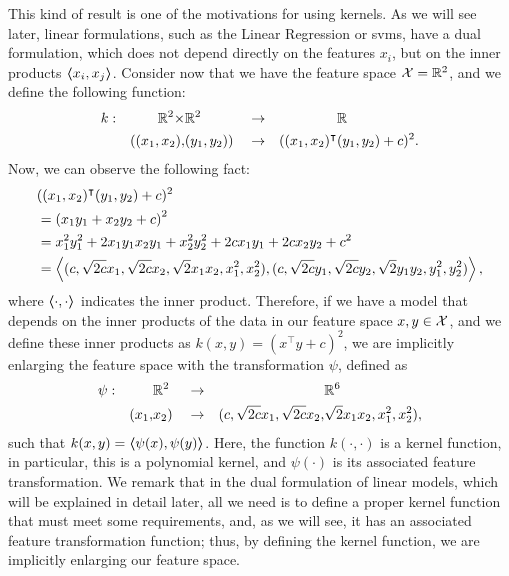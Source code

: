 This kind of result is one of the motivations for using kernels. 
As we will see later, linear formulations, such as the Linear Regression or \acrshort{svms}, have a dual formulation, which does not depend directly on the features $x_i$, but on the inner products $\bm{\left\langle} x_i, x_j \bm{\right\rangle}$.
Consider now that we have the feature space $\mathcal{X} = \mathbb{R}^2$, and we define the following function:
\begin{equation}
    \begin{aligned}
        \nonumber
        k: & &\mathbb{R}^2 \times &\mathbb{R}^2 & &\to& &\mathbb{R} \\
        & &((x_1, x_2), & (y_1, y_2))   & &\to& ((x_1, x_2)^\intercal &(y_1, y_2) + c)^2 .
    \end{aligned}
\end{equation}
Now, we can observe the following fact:
\begin{equation}
    \nonumber
    \begin{aligned}
        &((x_1, x_2)^\intercal (y_1, y_2) + c)^2 \\
        &= \left(x_1 y_1 + x_2 y_2 + c \right)^2 \\
        &= x_1^2 y_1^2 + 2 x_1 y_1 x_2 y_1+ x_2^2 y_2^2 + 2 c x_1 y_1 + 2 c x_2 y_2 + c^2 \\
        &= \bm{\left\langle} (c, \sqrt{2c} x_1, \sqrt{2c} x_2, \sqrt{2} x_1 x_2, x_1^2, x_2^2), (c, \sqrt{2c} y_1, \sqrt{2c} y_2, \sqrt{2} y_1 y_2, y_1^2, y_2^2) \bm{\right\rangle},
    \end{aligned}
\end{equation}
where $\bm{\left\langle} \cdot, \cdot \bm{\right\rangle}$ indicates the inner product.
Therefore, if we have a model that depends on the inner products of the data in our feature space $x, y \in \mathcal{X}$, and we define these inner products as $k(x, y) = (x^\intercal y + c)^2$, we are implicitly enlarging the feature space with the transformation $\psi$, defined as
\begin{equation}
    \begin{aligned}
        \nonumber
        \psi: & &&\mathbb{R}^2 & &\to& &\mathbb{R}^6 \\
        & &(x_1,& x_2)& &\to& (c, \sqrt{2c} x_1, \sqrt{2c} x_2,& \sqrt{2} x_1 x_2, x_1^2, x_2^2) ,
    \end{aligned}
\end{equation}
such that $k(x, y) = \bm{\left\langle} \psi(x), \psi(y) \bm{\right\rangle}$.
%
Here, the function $k(\cdot, \cdot)$ is a kernel function, in particular, this is a polynomial kernel, and $\psi(\cdot)$ is its associated feature transformation. 
We remark that in the dual formulation of linear models, which will be explained in detail later, all we need is to define a proper kernel function that must meet some requirements, and, as we will see, it has an associated feature transformation function; thus, by defining the kernel function, we are implicitly enlarging our feature space.




